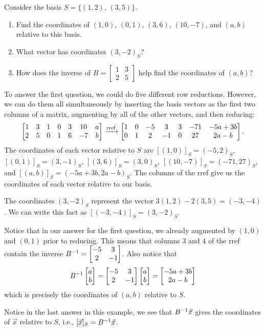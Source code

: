 \begin{example} Consider the basis $S=\{(1,2),\,(3,5)\}$. 
\begin{enumerate}
	\item Find the coordinates of $(1,0)$, $(0,1)$, $(3,6)$, $(10,-7)$, and $(a,b)$ relative to this basis.
	\item What vector has coordinates $(3,-2)_S$?
	\item How does the inverse of $B = \begin{bmatrix}1 & 3 \\ 2 & 5\end{bmatrix}$ help find the coordinates of $(a,b)$?
\end{enumerate}
 To answer the first question, we could do five different row reductions.  However, we can do them all simultaneously by inserting the basis vectors as the first two columns of a matrix, augmenting by all of the other vectors, and then reducing: 
$$\begin{bmatrix}
 1 & 3 & 1 & 0 & 3 & 10 & a \\
 2 & 5 & 0 & 1 & 6 & -7 & b
\end{bmatrix}
\xrightarrow{\operatorname{rref}}
\begin{bmatrix}
 1 & 0 & -5 & 3 & 3 & -71 & -5 a+3b \\
 0 & 1 & 2 & -1 & 0 & 27 & 2 a-b
\end{bmatrix}.$$
The coordinates of each vector relative to $S$ are $[(1,0)]_S = (-5,2)_S$, $[(0,1)]_S=(3,-1)_S$, $[(3,6)]_S=(3,0)_S$, $[(10,-7)]_S=(-71,27)_S$, and $[(a,b)]_S=(-5a+3b,2a-b)_S$. 
The columns of the rref give us the coordinates of each vector relative to our basis.

The coordinates $(3,-2)_S$ represent the vector $3(1,2)-2(3,5)=(-3,-4)$. We can write this fact as $[(-3,-4)]_S = (3,-2)_S$.

Notice that in our answer for the first question, we already augmented by $(1,0)$ and $(0,1)$ prior to reducing.  This means that columns 3 and 4 of the rref contain the inverse $B^{-1}  = \begin{bmatrix} -5 & 3\\ 2 & -1 \end{bmatrix}$.  Also notice that $$B^{-1} \begin{bmatrix} a\\b \end{bmatrix} = \begin{bmatrix} -5 & 3\\ 2 & -1 \end{bmatrix}\begin{bmatrix} a\\b \end{bmatrix} = \begin{bmatrix} -5a+3b\\2a-b \end{bmatrix}$$ which is precisely the coordinates of $(a,b)$ relative to $S$.  
\end{example}
Notice in the last answer in this example, we see that $B^{-1} \vec x$ gives the coordinates of $\vec x$ relative to $S$, i.e., $[\vec x]_S = B^{-1} \vec x$.

